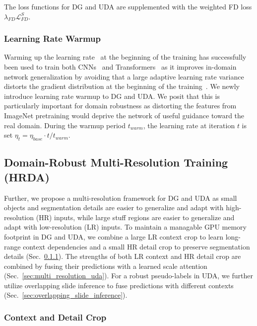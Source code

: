 \documentclass[journal,compsoc]{IEEEtran}
\begin{document}
The loss functions for DG and UDA are supplemented with the weighted FD loss $\lambda_\mathit{FD} \mathcal{L}^S_\mathit{FD}$.

\subsubsection{Learning Rate Warmup}
\label{sec:methods_warmup}

Warming up the learning rate~\cite{goyal2017accurate} at the beginning of the training has successfully been used to train both CNNs~\cite{he2016deep} and Transformers~\cite{vaswani2017attention, dosovitskiy2020image} as it improves in-domain network generalization by avoiding that a large adaptive learning rate variance distorts the gradient distribution at the beginning of the training~\cite{liu2019variance}. We newly introduce learning rate warmup to DG and UDA. We posit that this is particularly important for domain robustness as distorting the features from ImageNet pretraining would deprive the network of useful guidance toward the real domain. During the warmup period $t_\mathit{warm}$, the learning rate at iteration $t$ is set $\eta_t = \eta_\mathit{base} \cdot t / t_\mathit{warm}$.


\subsection{Domain-Robust Multi-Resolution Training (HRDA)}
\label{sec:methods_hrda}

Further, we propose a multi-resolution framework for DG and UDA as small objects and segmentation details are easier to generalize and adapt with high-resolution (HR) inputs, while large stuff regions are easier to generalize and adapt with low-resolution (LR) inputs.
To maintain a managable GPU memory footprint in DG and UDA, we combine a large LR context crop to learn long-range context dependencies and a small HR detail crop to preserve segmentation details (Sec.~\ref{sec:context_detail_crop}). The strengths of both LR context and HR detail crop are combined by fusing their predictions with a learned scale attention (Sec.~\ref{sec:multi_resolution_uda}).
For a robust pseudo-labels in UDA, we further utilize overlapping slide inference to fuse predictions with different contexts (Sec.~\ref{sec:overlapping_slide_inference}).

\subsubsection{Context and Detail Crop}
\label{sec:context_detail_crop}
\end{document}
